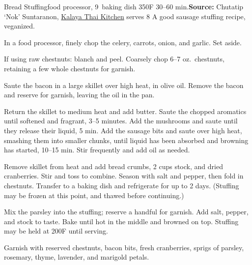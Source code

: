 \begin{recipe}{Bread Stuffing}{food processor, 9\inch{}\inch\ baking dish \hfill 350\0F \hfill 30--60 min.}{\textbf{Source:} Chutatip `Nok' Suntaranon, \href{https://www.kalaya.net/}{Kalaya Thai Kitchen} \hfill serves 8}
 \freeform A good sausage stuffing recipe, veganized.

 In a food processor, finely chop the celery, carrots, onion, and garlic. Set aside.

 If using raw chestnuts: blanch and peel. Coarsely chop 6--7 oz.\ chestnuts, retaining a few whole chestnuts for garnish.

 Saute the bacon in a large skillet over high heat, in olive oil. Remove the bacon and reserve for garnish, leaving the oil in the pan.

 Return the skillet to medium heat and add butter. Saute the chopped aromatics until softened and fragrant, 3--5 minutes. Add the mushrooms and saute until they release their liquid, 5 min. Add the sausage bits and saute over high heat, smashing them into smaller chunks, until liquid has been absorbed and browning has started, 10--15 min. Stir frequently and add oil as needed.

 Remove skillet from heat and add bread crumbs, 2 cups stock, and dried cranberries. Stir and toss to combine. Season with salt and pepper, then fold in chestnuts. Transfer to a baking dish and refrigerate for up to 2 days. (Stuffing may be frozen at this point, and thawed before continuing.)

 Mix the parsley into the stuffing; reserve a handful for garnish. Add salt, pepper, and stock to taste. Bake until hot in the middle and browned on top. Stuffing may be held at 200\0F until serving.

 \newstep Garnish with reserved chestnuts, bacon bits, fresh cranberries, sprigs of parsley, rosemary, thyme, lavender, and marigold petals.


\end{recipe}
